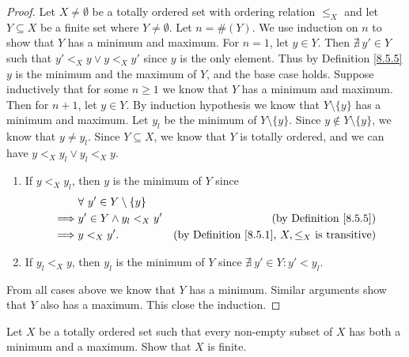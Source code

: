 \begin{proof}
    Let \(X \neq \emptyset\) be a totally ordered set with ordering relation \(\leq_X\) and let \(Y \subseteq X\) be a finite set where \(Y \neq \emptyset\).
    Let \(n = \#(Y)\).
    We use induction on \(n\) to show that \(Y\) has a minimum and maximum.
    For \(n = 1\), let \(y \in Y\).
    Then \(\nexists\ y' \in Y\) such that \(y' <_X y \lor y <_X y'\) since \(y\) is the only element.
    Thus by Definition \ref{8.5.5} \(y\) is the minimum and the maximum of \(Y\), and the base case holds.
    Suppose inductively that for some \(n \geq 1\) we know that \(Y\) has a minimum and maximum.
    Then for \(n + 1\), let \(y \in Y\).
    By induction hypothesis we know that \(Y \setminus \{y\}\) has a minimum and maximum.
    Let \(y_l\) be the minimum of \(Y \setminus \{y\}\).
    Since \(y \notin Y \setminus \{y\}\), we know that \(y \neq y_l\).
    Since \(Y \subseteq X\), we know that \(Y\) is totally ordered, and we can have \(y <_X y_l \lor y_l <_X y\).
    \begin{enumerate}
        \item If \(y <_X y_l\), then \(y\) is the minimum of \(Y\) since
              \begin{align*}
                           & \forall\ y' \in Y \setminus \{y\}                                                                   \\
                  \implies & y' \in Y \land y_l <_X y'         & \text{(by Definition \ref{8.5.5})}                              \\
                  \implies & y <_X y'.                         & \text{(by Definition \ref{8.5.1}, \(X, \leq_X\) is transitive)}
              \end{align*}
        \item If \(y_l <_X y\), then \(y_l\) is the minimum of \(Y\) since \(\nexists\ y' \in Y : y' < y_l\).
    \end{enumerate}
    From all cases above we know that \(Y\) has a minimum.
    Similar arguments show that \(Y\) also has a maximum.
    This close the induction.
\end{proof}

\begin{exercise}\label{ex 8.5.9}
    Let \(X\) be a totally ordered set such that every non-empty subset of \(X\) has both a minimum and a maximum.
    Show that \(X\) is finite.
\end{exercise}

